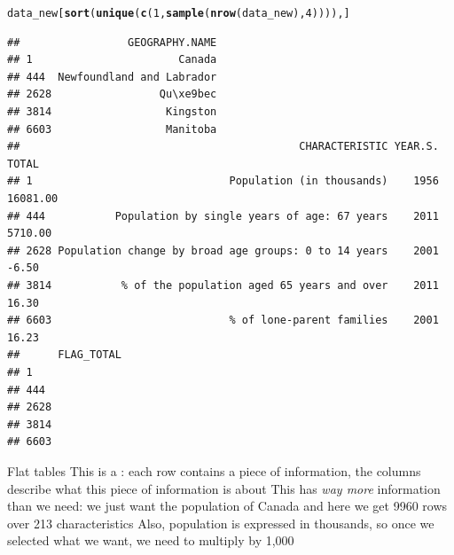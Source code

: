 \documentclass[aspectratio=169]{beamer}\usepackage[]{graphicx}\usepackage[]{xcolor}
\makeatletter
\newcommand{\hlnum}[1]{\textcolor[rgb]{0.686,0.059,0.569}{#1}}%
\newcommand{\hlsng}[1]{\textcolor[rgb]{0.192,0.494,0.8}{#1}}%
\newcommand{\hlopt}[1]{\textcolor[rgb]{0,0,0}{#1}}%
\newcommand{\hldef}[1]{\textcolor[rgb]{0.345,0.345,0.345}{#1}}%
\newcommand{\hlkwb}[1]{\textcolor[rgb]{0.69,0.353,0.396}{#1}}%
\newcommand{\hlkwd}[1]{\textcolor[rgb]{0.737,0.353,0.396}{\textbf{#1}}}%
\newenvironment{kframe}{%
 \def\at@end@of@kframe{}%
 \ifinner\ifhmode%
  \def\at@end@of@kframe{\end{minipage}}%
  \begin{minipage}{\columnwidth}%
 \fi\fi%
 \def\FrameCommand##1{\hskip\@totalleftmargin \hskip-\fboxsep
 \colorbox{shadecolor}{##1}\hskip-\fboxsep
     \hskip-\linewidth \hskip-\@totalleftmargin \hskip\columnwidth}%
 \MakeFramed {\advance\hsize-\width
   \@totalleftmargin\z@ \linewidth\hsize
   \@setminipage}}%
 {\par\unskip\endMakeFramed%
 \at@end@of@kframe}
\newenvironment{knitrout}{}{} %
\makeatother
\begin{document}
\begin{frame}[fragile]
\begin{knitrout}
\color{fgcolor}\begin{kframe}
\begin{alltt}
\hldef{data_new[}\hlkwd{sort}\hldef{(}\hlkwd{unique}\hldef{(}\hlkwd{c}\hldef{(}\hlnum{1}\hldef{,}\hlkwd{sample}\hldef{(}\hlkwd{nrow}\hldef{(data_new),} \hlnum{4}\hldef{)))), ]}
\end{alltt}
\begin{verbatim}
##                 GEOGRAPHY.NAME
## 1                       Canada
## 444  Newfoundland and Labrador
## 2628                 Qu\xe9bec
## 3814                  Kingston
## 6603                  Manitoba
##                                            CHARACTERISTIC YEAR.S.    TOTAL
## 1                               Population (in thousands)    1956 16081.00
## 444           Population by single years of age: 67 years    2011  5710.00
## 2628 Population change by broad age groups: 0 to 14 years    2001    -6.50
## 3814           % of the population aged 65 years and over    2011    16.30
## 6603                            % of lone-parent families    2001    16.23
##      FLAG_TOTAL
## 1              
## 444            
## 2628           
## 3814           
## 6603
\end{verbatim}
\end{kframe}
\end{knitrout}
\end{frame}


\begin{frame}{Flat tables}
This is a : each row contains a piece of information, the columns describe what this piece of information is about
\vfill
This has \emph{way more} information than we need: we just want the population of Canada and here we get 9960 rows over 213 characteristics
\vfill
Also, population is expressed in thousands, so once we selected what we want, we need to multiply by 1,000
\end{frame}

\end{document}
